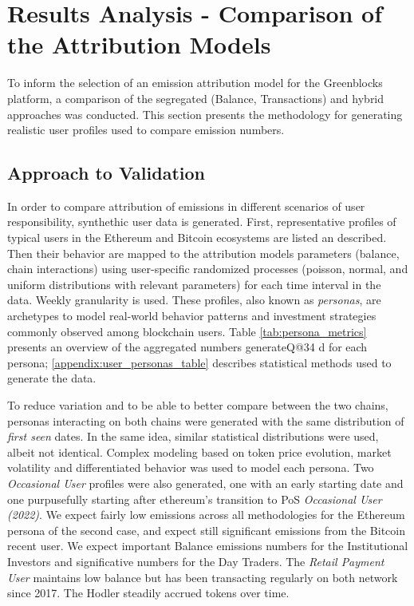 \documentclass[11pt]{report}
\begin{document}
\section{Results Analysis - Comparison of the Attribution Models \label{sec:results_analysis}}

To inform the selection of an emission attribution model for the Greenblocks platform, a comparison of the segregated (Balance, Transactions) and hybrid approaches was conducted. This section presents the methodology for generating realistic user profiles used to compare emission numbers.

\subsection{Approach to Validation \label{sec:approach_validation}}

In order to compare attribution of emissions in different scenarios of user responsibility, synthethic user data is generated. First, representative profiles of typical users in the Ethereum and Bitcoin ecosystems are listed an described. Then their behavior are mapped to the attribution models parameters (balance, chain interactions) using user-specific randomized processes (poisson, normal, and uniform distributions with relevant parameters) for each time interval in the data. Weekly granularity is used. These profiles, also known as \textit{personas}, are archetypes to model real-world behavior patterns and investment strategies commonly observed among blockchain users. Table \ref{tab:persona_metrics} presents an overview of the aggregated numbers generateQ@34
d for each persona; \ref{appendix:user_personas_table} describes statistical methods used to generate the data.






To reduce variation and to be able to better compare between the two chains, personas interacting on both chains were generated with the same distribution of \textit{first seen} dates. In the same idea, similar statistical distributions were used, albeit not identical. Complex modeling based on token price evolution, market volatility and differentiated behavior was used to model each persona. Two \textit{Occasional User} profiles were also generated, one with an early starting date and one purpusefully starting after ethereum's transition to PoS \textit{Occasional User (2022)}. We expect fairly low emissions across all methodologies for the Ethereum persona of the second case, and expect still significant emissions from the Bitcoin recent user. We expect important Balance emissions numbers for the Institutional Investors and significative numbers for the Day Traders. The \textit{Retail Payment User} maintains low balance but has been transacting regularly on both network since 2017. The Hodler steadily accrued tokens over time.
\end{document}
